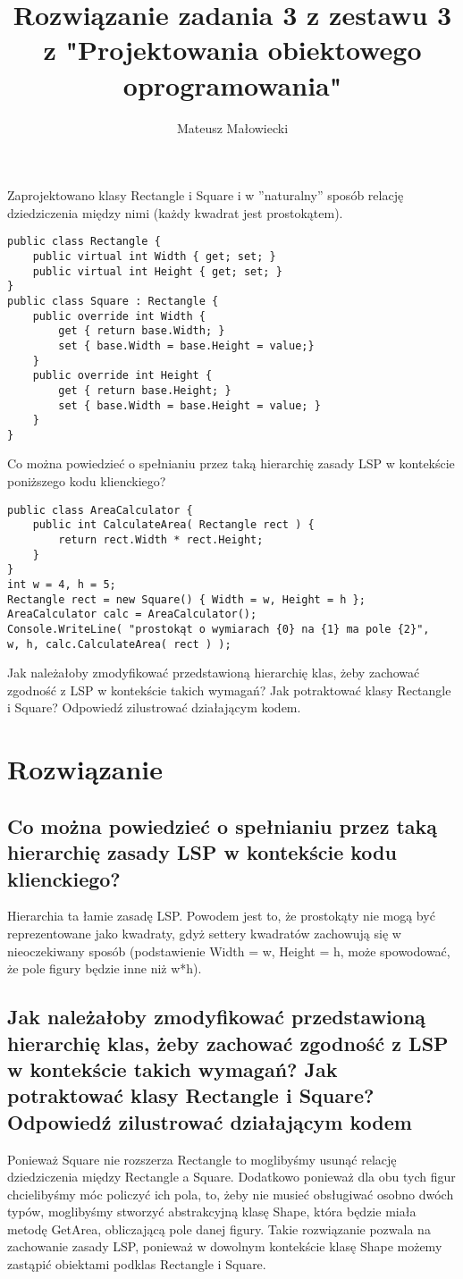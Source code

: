 \documentclass[10pt, a4paper]{article}
\title{Rozwiązanie zadania 3 z zestawu 3 z "Projektowania obiektowego oprogramowania"}
\author{Mateusz Małowiecki}
\begin{document}
\maketitle
Zaprojektowano klasy Rectangle i Square i w
”naturalny” sposób relację dziedziczenia między nimi (każdy kwadrat jest prostokątem).
\begin{verbatim}
public class Rectangle {
    public virtual int Width { get; set; }
    public virtual int Height { get; set; }
}
public class Square : Rectangle {
    public override int Width {
        get { return base.Width; }
        set { base.Width = base.Height = value;}
    }
    public override int Height {
        get { return base.Height; }
        set { base.Width = base.Height = value; }
    }
}
\end{verbatim}
Co można powiedzieć o spełnianiu przez taką hierarchię zasady LSP w kontekście poniższego kodu klienckiego?
\begin{verbatim}
public class AreaCalculator {
    public int CalculateArea( Rectangle rect ) {
        return rect.Width * rect.Height;
    }
}
int w = 4, h = 5;
Rectangle rect = new Square() { Width = w, Height = h };
AreaCalculator calc = AreaCalculator();
Console.WriteLine( "prostokąt o wymiarach {0} na {1} ma pole {2}",
w, h, calc.CalculateArea( rect ) );
\end{verbatim}
Jak należałoby zmodyfikować przedstawioną hierarchię klas, żeby zachować zgodność z LSP
w kontekście takich wymagań? Jak potraktować klasy Rectangle i Square? Odpowiedź
zilustrować działającym kodem.
\section*{Rozwiązanie}
\subsection*{Co można powiedzieć o spełnianiu przez taką hierarchię zasady LSP w kontekście kodu klienckiego?}
Hierarchia ta łamie zasadę LSP. Powodem jest to, że prostokąty nie mogą być reprezentowane jako kwadraty, gdyż settery kwadratów zachowują się w nieoczekiwany sposób (podstawienie Width = w, Height = h, może spowodować, że pole figury będzie inne niż w*h).
\subsection*{Jak należałoby zmodyfikować przedstawioną hierarchię klas, żeby zachować zgodność z LSP w kontekście takich wymagań? Jak potraktować klasy Rectangle i Square? Odpowiedź zilustrować działającym kodem}
Ponieważ Square nie rozszerza Rectangle to moglibyśmy usunąć relację dziedziczenia między Rectangle a Square. Dodatkowo ponieważ dla obu tych figur chcielibyśmy móc policzyć ich pola, to, żeby nie musieć obsługiwać osobno dwóch typów, moglibyśmy stworzyć abstrakcyjną klasę Shape, która będzie miała metodę GetArea, obliczającą pole danej figury. Takie rozwiązanie pozwala na zachowanie zasady LSP, ponieważ w dowolnym kontekście klasę Shape możemy zastąpić obiektami podklas Rectangle i Square.
\end{document}
